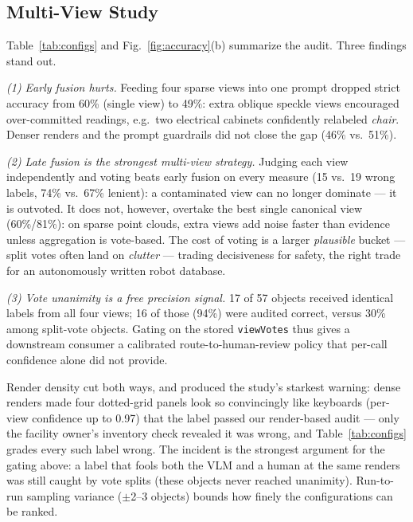 \documentclass[conference]{IEEEtran}
\begin{document}
\subsection{Multi-View Study}
\label{sec:study}
Table~\ref{tab:configs} and Fig.~\ref{fig:accuracy}(b) summarize the
audit. Three findings stand out.

\emph{(1) Early fusion hurts.} Feeding four sparse views into one prompt
dropped strict accuracy from 60\% (single view) to 49\%: extra oblique
speckle views encouraged over-committed readings, e.g.\ two electrical
cabinets confidently relabeled \emph{chair}. Denser renders and the prompt
guardrails did not close the gap (46\% vs.\ 51\%).

\emph{(2) Late fusion is the strongest multi-view strategy.} Judging each
view independently and voting beats early fusion on every measure (15 vs.\
19 wrong labels, 74\% vs.\ 67\% lenient): a contaminated view can no
longer dominate --- it is outvoted. It does not, however, overtake the best
single canonical view (60\%/81\%): on sparse point clouds, extra views
add noise faster than evidence unless aggregation is vote-based. The cost
of voting is a larger \emph{plausible} bucket --- split votes often land
on \emph{clutter} --- trading decisiveness for safety, the right trade for
an autonomously written robot database.

\emph{(3) Vote unanimity is a free precision signal.} 17 of 57 objects
received identical labels from all four views; 16 of those (94\%) were
audited correct, versus 30\% among split-vote objects. Gating on the stored
\texttt{viewVotes} thus gives a downstream consumer a calibrated
route-to-human-review policy that per-call confidence alone did not
provide.

Render density cut both ways, and produced the study's starkest warning:
dense renders made four dotted-grid panels look so convincingly like
keyboards (per-view confidence up to 0.97) that the label passed our
render-based audit --- only the facility owner's inventory check revealed
it was wrong, and Table~\ref{tab:configs} grades every such label wrong.
The incident is the strongest argument for the gating above: a label that
fools both the VLM and a human at the same renders was still caught by
vote splits (these objects never reached unanimity). Run-to-run sampling
variance ($\pm$2--3 objects) bounds how finely the configurations can be
ranked.
\end{document}
